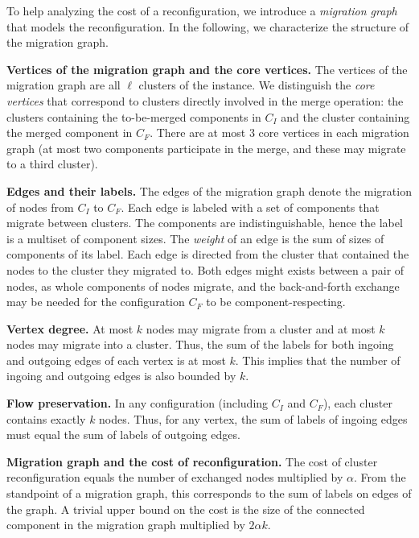 \documentclass[a4paper,USenglish]{lipics-v2019}
\begin{document}
To help analyzing the cost of a reconfiguration, we introduce a \emph{migration graph} that models the reconfiguration.
In the following, we characterize the structure of the migration graph.

\noindent
\textbf{Vertices of the migration graph and the core vertices.}
The vertices of the migration graph are all $\ell$ clusters of the instance.
We distinguish the \emph{core vertices} that correspond to clusters directly involved in the merge operation: the clusters containing the to-be-merged components in $C_I$ and the cluster containing the merged component in $C_F$.
There are at most $3$ core vertices in each migration graph (at most two components participate in the merge, and these may migrate to a third cluster).

\noindent
\textbf{Edges and their labels.}
The edges of the migration graph denote the migration of nodes from $C_I$ to $C_F$.
Each edge is labeled with a set of components that migrate between clusters.
The components are indistinguishable, hence the label is a multiset of component
sizes.
The \emph{weight} of an edge is the sum of sizes of components of its label.
Each edge is directed from the cluster that contained the nodes to the cluster they migrated to.
Both edges might exists between a pair of nodes, as whole components of nodes migrate, and the back-and-forth exchange may be needed for the configuration $C_F$ to be component-respecting.

\noindent
\textbf{Vertex degree.}
At most $k$ nodes may migrate from a cluster and at most $k$ nodes may migrate into a cluster.
Thus, the sum of the labels for both ingoing and outgoing edges of each vertex is at most $k$.
This implies that the number of ingoing and outgoing edges is also bounded by $k$.

\noindent
\textbf{Flow preservation.}
In any configuration (including $C_I$ and $C_F$), each cluster contains exactly $k$ nodes.
Thus, for any vertex, the sum of labels of ingoing edges must equal the sum of labels of outgoing edges.

\noindent
\textbf{Migration graph and the cost of reconfiguration.}
The cost of cluster reconfiguration equals the number of exchanged nodes multiplied by $\alpha$.
From the standpoint of a migration graph, this corresponds to the sum of labels on edges of the graph.
A trivial upper bound on the cost is the size of the connected component in the migration graph multiplied by $2\alpha k$.

\medskip
\end{document}
